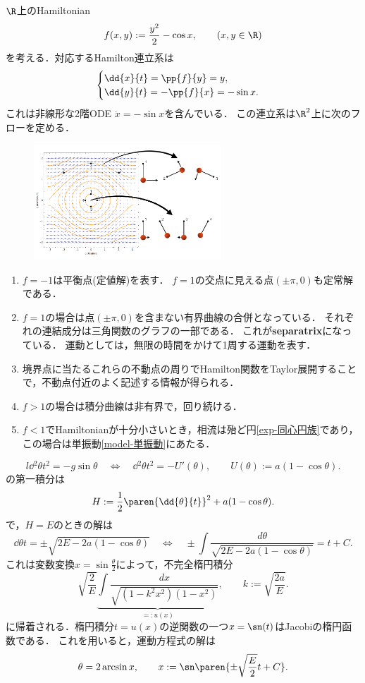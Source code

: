 \documentclass[uplatex,dvipdfmx]{jsreport}
\begin{document}
\begin{example}[振り子]
    $\R$上のHamiltonian
    \[f(x,y):=\frac{y^2}{2}-\cos x,\qquad(x,y\in\R)\]
    を考える．対応するHamilton連立系は
    \[\begin{cases}
        \dd{x}{t}=\pp{f}{y}=y,\\
        \dd{y}{t}=-\pp{f}{x}=-\sin x.
    \end{cases}\]
    これは非線形な2階ODE $\ddot{x}=-\sin x$を含んでいる．
    この連立系は$\R^2$上に次のフローを定める．
    \begin{center}
        \begin{figure}[h]\centering
            \includegraphics[width=7cm]{HamiltonianFlow.png}
        \end{figure}
    \end{center}
    \begin{enumerate}
        \item $f=-1$は平衡点(定値解)を表す．
        $f=1$の交点に見える点$(\pm\pi,0)$も定常解である．
        \item $f=1$の場合は点$(\pm\pi,0)$を含まない有界曲線の合併となっている．
        それぞれの連結成分は三角関数のグラフの一部である．
        これが\textbf{separatrix}になっている．
        運動としては，無限の時間をかけて1周する運動を表す．
        \item 境界点に当たるこれらの不動点の周りでHamilton関数をTaylor展開することで，不動点付近のよく記述する情報が得られる．
        \item $f>1$の場合は積分曲線は非有界で，回り続ける．
        \item $f<1$でHamiltonianが十分小さいとき，相流は殆ど円\ref{exp-同心円族}であり，この場合は単振動\ref{model-単振動}にあたる．
    \end{enumerate}
\end{example}
\begin{model}
    \[l\dd{^2\theta}{t^2}=-g\sin\theta\quad\Leftrightarrow\quad\dd{^2\theta}{t^2}=-U'(\theta),\qquad U(\theta):=a(1-\cos\theta).\]
    の第一積分は
    \[H:=\frac{1}{2}\paren{\dd{\theta}{t}}^2+a(1-\cos\theta).\]
    で，$H=E$のときの解は
    \[\dd{\theta}{t}=\pm\sqrt{2E-2a(1-\cos\theta)}\quad\Leftrightarrow\quad\pm\int\frac{d\theta}{\sqrt{2E-2a(1-\cos\theta)}}=t+C.\]
    これは変数変換$x=\sin\frac{\theta}{2}$によって，不完全楕円積分
    \[\sqrt{\frac{2}{E}}\underbrace{\int\frac{dx}{\sqrt{(1-k^2x^2)(1-x^2)}}}_{=:u(x)},\qquad k:=\sqrt{\frac{2a}{E}}.\]
    に帰着される．楕円積分$t=u(x)$の逆関数の一つ$x=\sn(t)$はJacobiの楕円函数である．
    これを用いると，運動方程式の解は
    \[\theta=2\arcsin x,\qquad x:=\sn\paren{\pm\sqrt{\frac{E}{2}}t+C}.\]
\end{model}
\end{document}
